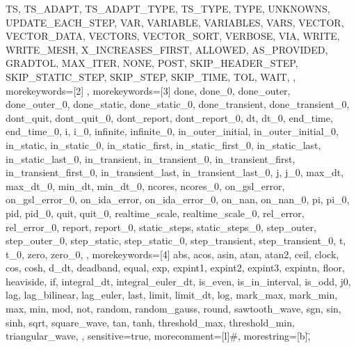 {{      TS,
      TS_ADAPT,
      TS_ADAPT_TYPE,
      TS_TYPE,
      TYPE,
      UNKNOWNS,
      UPDATE_EACH_STEP,
      VAR,
      VARIABLE,
      VARIABLES,
      VARS,
      VECTOR,
      VECTOR_DATA,
      VECTORS,
      VECTOR_SORT,
      VERBOSE,
      VIA,
      WRITE,
      WRITE_MESH,
      X_INCREASES_FIRST,
      ALLOWED,
      AS_PROVIDED,
      GRADTOL,
      MAX_ITER,
      NONE,
      POST,
      SKIP_HEADER_STEP,
      SKIP_STATIC_STEP,
      SKIP_STEP,
      SKIP_TIME,
      TOL,
      WAIT,
},
morekeywords={[2]
},
morekeywords={[3]
      done,
      done_0,
      done_outer,
      done_outer_0,
      done_static,
      done_static_0,
      done_transient,
      done_transient_0,
      dont_quit,
      dont_quit_0,
      dont_report,
      dont_report_0,
      dt,
      dt_0,
      end_time,
      end_time_0,
      i,
      i_0,
      infinite,
      infinite_0,
      in_outer_initial,
      in_outer_initial_0,
      in_static,
      in_static_0,
      in_static_first,
      in_static_first_0,
      in_static_last,
      in_static_last_0,
      in_transient,
      in_transient_0,
      in_transient_first,
      in_transient_first_0,
      in_transient_last,
      in_transient_last_0,
      j,
      j_0,
      max_dt,
      max_dt_0,
      min_dt,
      min_dt_0,
      ncores,
      ncores_0,
      on_gsl_error,
      on_gsl_error_0,
      on_ida_error,
      on_ida_error_0,
      on_nan,
      on_nan_0,
      pi,
      pi_0,
      pid,
      pid_0,
      quit,
      quit_0,
      realtime_scale,
      realtime_scale_0,
      rel_error,
      rel_error_0,
      report,
      report_0,
      static_steps,
      static_steps_0,
      step_outer,
      step_outer_0,
      step_static,
      step_static_0,
      step_transient,
      step_transient_0,
      t,
      t_0,
      zero,
      zero_0,
},
morekeywords={[4]
      abs,
      acos,
      asin,
      atan,
      atan2,
      ceil,
      clock,
      cos,
      cosh,
      d_dt,
      deadband,
      equal,
      exp,
      expint1,
      expint2,
      expint3,
      expintn,
      floor,
      heaviside,
      if,
      integral_dt,
      integral_euler_dt,
      is_even,
      is_in_interval,
      is_odd,
      j0,
      lag,
      lag_bilinear,
      lag_euler,
      last,
      limit,
      limit_dt,
      log,
      mark_max,
      mark_min,
      max,
      min,
      mod,
      not,
      random,
      random_gauss,
      round,
      sawtooth_wave,
      sgn,
      sin,
      sinh,
      sqrt,
      square_wave,
      tan,
      tanh,
      threshold_max,
      threshold_min,
      triangular_wave,
},
sensitive=true,
morecomment=[l]{\#},
morestring=[b]\",
}
